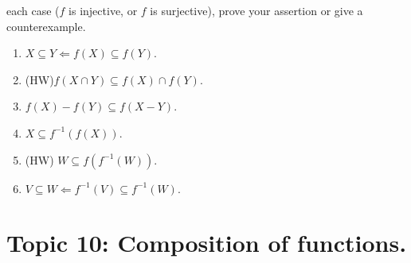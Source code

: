 \documentclass[12pt]{article}
\begin{document}
\begin{itemize}
  each case ($f$ is injective, or $f$ is surjective), prove your
  assertion or give a counterexample.
  \begin{enumerate}
  \item $X \subseteq Y \Leftarrow f(X) \subseteq f(Y)$.
  \item (HW)$f(X \cap Y) \subseteq f(X) \cap f(Y)$.
  \item $f(X) - f(Y) \subseteq f(X - Y)$.
  \item $X \subseteq f^{-1}(f(X))$.
  \item (HW) $W \subseteq f(f^{-1}(W))$.
  \item $V \subseteq W \Leftarrow f^{-1}(V) \subseteq f^{-1}(W)$.
  \end{enumerate}
\end{itemize}





\newpage
\section[10 (\csname dateWeek10\endcsname): Composition of functions.]{Topic  10: Composition of functions.}
\end{document}
